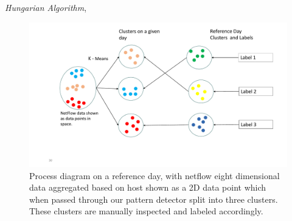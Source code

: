 \textit{Hungarian Algorithm}, 
 
 \begin{figure}[t]
 	\centerline{\includegraphics[scale = 0.5]{assign_prob.pdf}}
 	\caption{Process diagram on a reference day, with netflow eight dimensional data aggregated based on host shown as a 2D data point which when passed through our pattern detector split into three clusters. These clusters are manually inspected and labeled accordingly. }%
 \end{figure}

